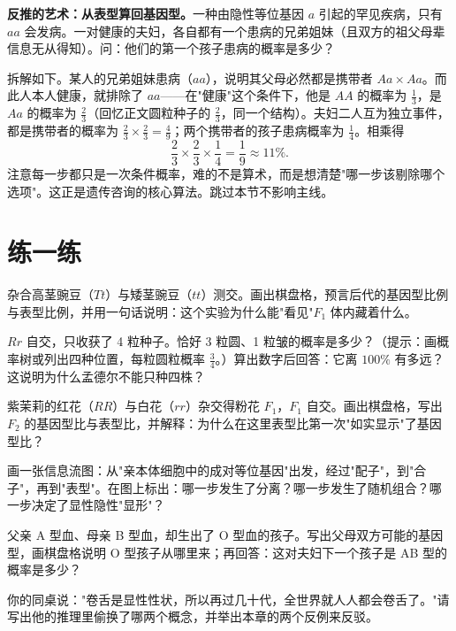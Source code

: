 \begin{tiaozhan}
\textbf{反推的艺术：从表型算回基因型。}一种由隐性等位基因 $a$ 引起的罕见疾病，只有 $aa$ 会发病。一对健康的夫妇，各自都有一个患病的兄弟姐妹（且双方的祖父母辈信息无从得知）。问：他们的第一个孩子患病的概率是多少？

拆解如下。某人的兄弟姐妹患病（$aa$），说明其父母必然都是携带者 $Aa \times Aa$。而此人本人健康，就排除了 $aa$——在"健康"这个条件下，他是 $AA$ 的概率为 $\frac{1}{3}$，是 $Aa$ 的概率为 $\frac{2}{3}$（回忆正文圆粒种子的 $\frac{2}{3}$，同一个结构）。夫妇二人互为独立事件，都是携带者的概率为 $\frac{2}{3}\times\frac{2}{3}=\frac{4}{9}$；两个携带者的孩子患病概率为 $\frac{1}{4}$。相乘得
\[
\frac{2}{3}\times\frac{2}{3}\times\frac{1}{4}=\frac{1}{9}\approx 11\%.
\]
注意每一步都只是一次条件概率，难的不是算术，而是想清楚"哪一步该剔除哪个选项"。这正是遗传咨询的核心算法。跳过本节不影响主线。
\end{tiaozhan}

\section*{练一练}

\begin{sikaoti}
\item 杂合高茎豌豆（$Tt$）与矮茎豌豆（$tt$）测交。画出棋盘格，预言后代的基因型比例与表型比例，并用一句话说明：这个实验为什么能"看见"$F_1$ 体内藏着什么。
\item $Rr$ 自交，只收获了 4 粒种子。恰好 3 粒圆、1 粒皱的概率是多少？（提示：画概率树或列出四种位置，每粒圆粒概率 $\frac{3}{4}$。）算出数字后回答：它离 $100\%$ 有多远？这说明为什么孟德尔不能只种四株？
\item 紫茉莉的红花（$RR$）与白花（$rr$）杂交得粉花 $F_1$，$F_1$ 自交。画出棋盘格，写出 $F_2$ 的基因型比与表型比，并解释：为什么在这里表型比第一次"如实显示"了基因型比？
\item 画一张信息流图：从"亲本体细胞中的成对等位基因"出发，经过"配子"，到"合子"，再到"表型"。在图上标出：哪一步发生了分离？哪一步发生了随机组合？哪一步决定了显性隐性"显形"？
\item 父亲 A 型血、母亲 B 型血，却生出了 O 型血的孩子。写出父母双方可能的基因型，画棋盘格说明 O 型孩子从哪里来；再回答：这对夫妇下一个孩子是 AB 型的概率是多少？
\item 你的同桌说："卷舌是显性性状，所以再过几十代，全世界就人人都会卷舌了。"请写出他的推理里偷换了哪两个概念，并举出本章的两个反例来反驳。
\end{sikaoti}
